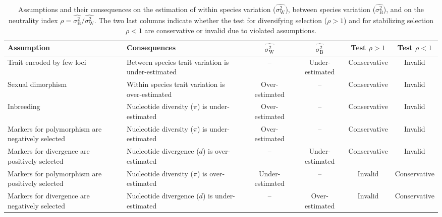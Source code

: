 \documentclass{article}
\newcommand{\RateBetween}{\sigma^2_{\mathrm{B}}}
\newcommand{\RateWhithin}{\sigma^2_{\mathrm{W}}}
\newcommand{\EstRateBetween}{\widehat{\RateBetween}}
\newcommand{\EstRateWhithin}{\widehat{\RateWhithin}}
\newcommand{\NI}{\rho}
\begin{document}
\begin{table*}[t!]
    \centering
    \begin{adjustbox}{width = 1.0\textwidth}
        \begin{tabular}{||l|l||c|c||c|c||}
            \hline
            Assumption                                       & Consequences                                       & $\EstRateWhithin$   & $\EstRateBetween$   & Test $\NI > 1$ & Test $\NI < 1$ \\ \hline \hline
            Trait encoded by few loci                        & Between species trait variation is under-estimated & --              & Under-estimated & Conservative & Invalid  \\ \hline
            Sexual dimorphism                                & Within species trait variation is over-estimated   & Over-estimated & -- & Conservative & Invalid  \\ \hline
            Inbreeding                                       & Nucleotide diversity ($\pi$) is under-estimated    & Over-estimated  & --              & Conservative & Invalid  \\ \hline
            Markers for polymorphism are negatively selected & Nucleotide diversity ($\pi$) is under-estimated  & Over-estimated & -- & Conservative & Invalid  \\ \hline
            Markers for divergence are positively selected   & Nucleotide divergence ($d$) is over-estimated & -- & Under-estimated & Conservative & Invalid  \\ \hline
            Markers for polymorphism are positively selected & Nucleotide diversity ($\pi$) is over-estimated  & Under-estimated & -- & Invalid & Conservative  \\ \hline
            Markers for divergence are negatively selected   & Nucleotide divergence ($d$) is under-estimated & -- & Over-estimated & Invalid & Conservative  \\ \hline
        \end{tabular}
    \end{adjustbox}
    \caption{Assumptions and their consequences on the estimation of within species variation ($\EstRateWhithin$), between species variation ($\EstRateBetween$), and on the neutrality index $\NI = \EstRateBetween/\EstRateWhithin$.
    The two last columns indicate whether the test for diversifying selection ($\NI > 1$) and for stabilizing selection $\NI < 1$ are conservative or invalid due to violated assumptions.
    }
    \label{table:assumptions}
\end{table*}
\end{document}
